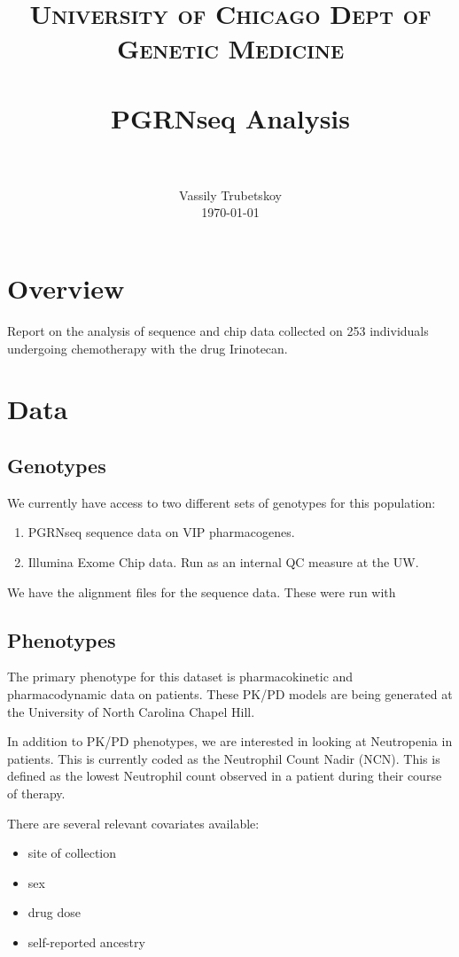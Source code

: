 \documentclass[paper=a4, fontsize=11pt]{scrartcl}	%
\title{
		\usefont{OT1}{bch}{b}{n}
		\normalfont \normalsize \textsc{University of Chicago Dept of Genetic Medicine} \\ [25pt]
		\horrule{0.5pt} \\[0.4cm]
		\huge PGRNseq Analysis \\
		\horrule{2pt} \\[0.5cm]
}
\author{
		\normalfont 								\normalsize
        Vassily Trubetskoy \\[-3pt]		\normalsize
        \today
}
\date{}
\numberwithin{equation}{section}		%
\numberwithin{figure}{section}			%
\numberwithin{table}{section}				%
\begin{document}
\maketitle
\section{Overview}

Report on the analysis of sequence and chip data collected on 253 individuals undergoing chemotherapy with the drug Irinotecan.

\section{Data}

	\subsection{Genotypes}

We currently have access to two different sets of genotypes for this population:
	
	\begin{enumerate}
		\item PGRNseq sequence data on VIP pharmacogenes.
		\item Illumina Exome Chip data. Run as an internal QC measure at the UW.
	\end{enumerate}
	
We have the alignment files for the sequence data. These were run with

	\subsection{Phenotypes}
	
The primary phenotype for this dataset is pharmacokinetic and pharmacodynamic data on patients. These PK/PD models are being generated at the University of North Carolina Chapel Hill.

In addition to PK/PD phenotypes, we are interested in looking at Neutropenia in patients. This is currently coded as the Neutrophil Count Nadir (NCN). This is defined as the lowest Neutrophil count observed in a patient during their course of therapy.

There are several relevant covariates available:
	\begin{itemize}
		\item site of collection
		\item sex
		\item drug dose
		\item self-reported ancestry
	\end{itemize}
\end{document}
